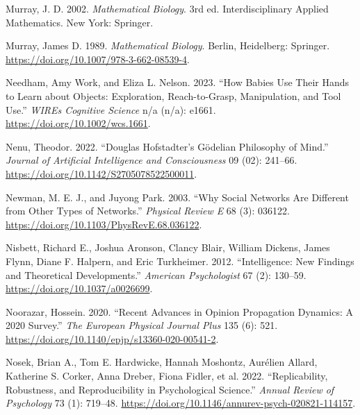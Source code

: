 \documentclass[
  a4paper,
  DIV=11,
  numbers=noendperiod,
  oneside]{scrreprt}
\newlength{\cslhangindent}
\newlength{\cslentryspacingunit} %
\newenvironment{CSLReferences}[2] %
 {%
  \setlength{\parindent}{0pt}
  \ifodd #1
  \let\oldpar\par
  \def\par{\hangindent=\cslhangindent\oldpar}
  \fi
  \setlength{\parskip}{#2\cslentryspacingunit}
 }%
 {}
\begin{document}
\begin{CSLReferences}{1}{0}
\leavevmode{}%
Murray, J. D. 2002. \emph{Mathematical Biology}. 3rd ed.
Interdisciplinary Applied Mathematics. {New York}: {Springer}.

\leavevmode{}%
Murray, James D. 1989. \emph{Mathematical Biology}. Berlin, Heidelberg:
Springer. \url{https://doi.org/10.1007/978-3-662-08539-4}.

\leavevmode{}%
Needham, Amy Work, and Eliza L. Nelson. 2023. {``How Babies Use Their
Hands to Learn about Objects: {Exploration}, Reach-to-Grasp,
Manipulation, and Tool Use.''} \emph{WIREs Cognitive Science} n/a (n/a):
e1661. \url{https://doi.org/10.1002/wcs.1661}.

\leavevmode{}%
Nenu, Theodor. 2022. {``Douglas Hofstadter{'}s Gödelian Philosophy of
Mind.''} \emph{Journal of Artificial Intelligence and Consciousness} 09
(02): 241--66. \url{https://doi.org/10.1142/S2705078522500011}.

\leavevmode{}%
Newman, M. E. J., and Juyong Park. 2003. {``Why Social Networks Are
Different from Other Types of Networks.''} \emph{Physical Review E} 68
(3): 036122. \url{https://doi.org/10.1103/PhysRevE.68.036122}.

\leavevmode{}%
Nisbett, Richard E., Joshua Aronson, Clancy Blair, William Dickens,
James Flynn, Diane F. Halpern, and Eric Turkheimer. 2012.
{``Intelligence: New Findings and Theoretical Developments.''}
\emph{American Psychologist} 67 (2): 130--59.
\url{https://doi.org/10.1037/a0026699}.

\leavevmode{}%
Noorazar, Hossein. 2020. {``Recent Advances in Opinion Propagation
Dynamics: A 2020 Survey.''} \emph{The European Physical Journal Plus}
135 (6): 521. \url{https://doi.org/10.1140/epjp/s13360-020-00541-2}.

\leavevmode{}%
Nosek, Brian A., Tom E. Hardwicke, Hannah Moshontz, Aurélien Allard,
Katherine S. Corker, Anna Dreber, Fiona Fidler, et al. 2022.
{``Replicability, {Robustness}, and {Reproducibility} in {Psychological
Science}.''} \emph{Annual Review of Psychology} 73 (1): 719--48.
\url{https://doi.org/10.1146/annurev-psych-020821-114157}.


\end{CSLReferences}
\end{document}

